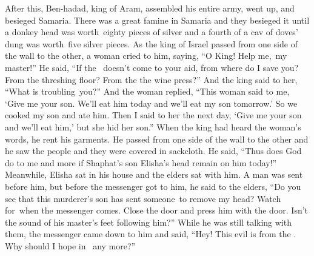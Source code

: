 \begin{inparaenum}
   After this, Ben-hadad, king of Aram, assembled his entire army, went up, and besieged Samaria.%
   There was a great famine in Samaria and they besieged it until a donkey head was worth\understood\ eighty pieces of silver and a fourth of a cav of doves' dung was worth\understood\ five silver pieces.%
   As the king of Israel passed from one side of the wall to the other, a woman cried to him, saying, ``O King! Help me,\understood\ my master!''%
   He said, ``If the \lord\ doesn't come to your aid, from where do I save you? From the threshing floor? From the the wine press?''%
   And the king said to her, ``What is troubling\understood\ you?'' And the woman replied, ``This woman said to me, `Give me your son. We'll eat him today and we'll eat my son tomorrow.'%
   So we cooked my son and ate him. Then I said to her the next day, `Give me your son and we'll eat him,' but she hid her son.''%
   When the king had heard the woman's words, he rent his garments. He passed from one side of the wall to the other and he saw the people and they were covered in sackcloth.%
   He said, ``Thus does God do to me and more if Shaphat's son Elisha's head remain on him today!''%
   Meanwhile, Elisha sat in his house and the elders sat with him. A man was sent before him, but before the messenger got to him, he said to the elders, ``Do you see that this murderer's son has sent someone\understood\ to remove my head? Watch for\understood\ when the messenger comes. Close the door and press him with the door. Isn't the sound of his master's feet following him?''%
   While he was still talking with them, the messenger came down to him and said, ``Hey! This evil is from the \lord. Why should I hope in \god\ any more?''%
\end{inparaenum}
